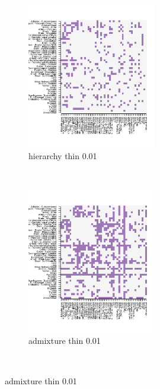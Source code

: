  
  \begin{figure}[ht]
    \centering    
     \begin{subfigure}[t]{0.5\textwidth}
        \centering
        \includegraphics[height=2.5in]{../plots/rsz_1hierarchy_F_thin_0_01.png}
        \caption{hierarchy thin 0.01}
    \end{subfigure}%
    ~
    \begin{subfigure}[t]{0.5\textwidth}
        \centering
        \includegraphics[height=2.5in]{../plots/rsz_1admixture_F_thin_0_01.png}
        \caption{admixture thin 0.01}
    \end{subfigure}\\
    

\end{figure}
